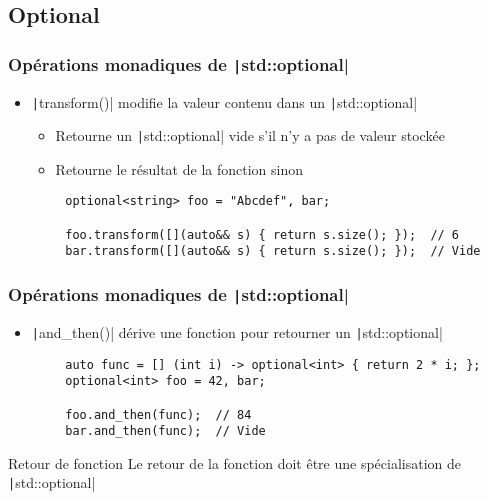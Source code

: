 \documentclass[C++.tex]{subfiles}
\begin{document}
\subsection*{Optional}
\begin{frame}[fragile]
	\frametitle{Opérations monadiques de \texttt|std::optional|}
	\begin{itemize}
		\item \texttt|transform()| modifie la valeur contenu dans un \texttt|std::optional|


		\begin{itemize}
			\item Retourne un \texttt|std::optional| vide s'il n'y a pas de valeur stockée
			\item Retourne le résultat de la fonction sinon
		\end{itemize}
	\end{itemize}

	\begin{verbatim}
		optional<string> foo = "Abcdef", bar;

		foo.transform([](auto&& s) { return s.size(); });  // 6
		bar.transform([](auto&& s) { return s.size(); });  // Vide
	\end{verbatim}
\end{frame}

\begin{frame}[fragile]
	\frametitle{Opérations monadiques de \texttt|std::optional|}
	\begin{itemize}
		\item \texttt|and_then()| dérive une fonction pour retourner un \texttt|std::optional|
	\end{itemize}

	\begin{verbatim}
		auto func = [] (int i) -> optional<int> { return 2 * i; };
		optional<int> foo = 42, bar;

		foo.and_then(func);  // 84
		bar.and_then(func);  // Vide
	\end{verbatim}

	\begin{alertblock}{Retour de fonction}
		Le retour de la fonction doit être une spécialisation de \texttt|std::optional|
	\end{alertblock}
\end{frame}
\end{document}
